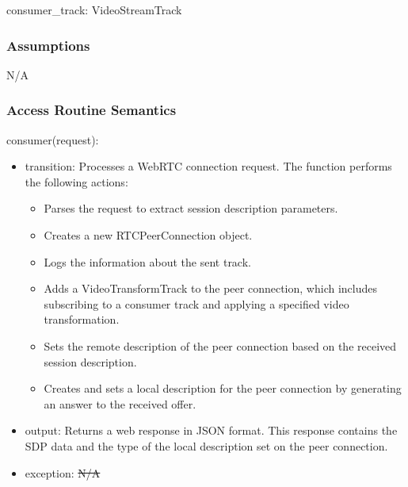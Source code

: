 \documentclass[12pt, titlepage]{article}
\newcommand{\rt}[1]{\textcolor{red}{#1}}
\begin{document}
consumer\_track: VideoStreamTrack

\subsubsection{Assumptions}
N/A

\subsubsection{Access Routine Semantics}

\noindent consumer(request):
\begin{itemize}
\item transition: Processes a WebRTC connection request. The function performs the
  following actions:
  \begin{itemize}
  \item Parses the request to extract session description parameters.
  \item Creates a new RTCPeerConnection object.
  \item Logs the information about the sent track.
  \item Adds a VideoTransformTrack to the peer connection, which includes subscribing
    to a consumer track and applying a specified video transformation.
  \item Sets the remote description of the peer connection based on the received session description.
  \item Creates and sets a local description for the peer connection by generating an answer to the received offer.
  \end{itemize}
\item output: Returns a web response in JSON format. This response contains the SDP
  data and the type of the local description set on the peer connection.
\item exception: \sout{N/A} \rt{}
\end{itemize}
\end{document}
